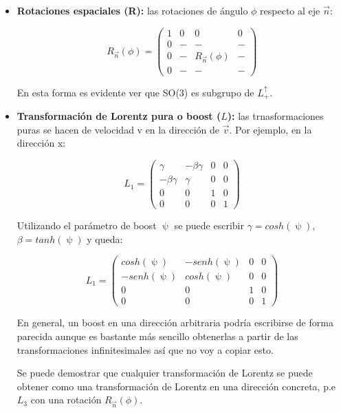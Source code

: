 \documentclass{article}
\begin{document}
\begin{itemize}
\item \textbf{Rotaciones espaciales (R):} las rotaciones de ángulo $\phi$ respecto al eje $\Vec{n}$:

$$R_{\Vec{n}}(\phi) = \left( \begin{array}{c|ccc}
     1& 0 & 0 & 0  \\
     \hline
       0& - & - & -  \\
         0& - & R_\Vec{n}(\phi) & -  \\
           0& - & - & -
\end{array}\right)$$

En esta forma es evidente ver que SO(3) es subgrupo de $L_+^\uparrow$.

\newpage

\item \textbf{Transformación de Lorentz pura o boost  ($L$):} las trnasformaciones puras se hacen de velocidad v en la dirección de $\Vec{v}$. Por ejemplo, en la dirección x:

$$L_1=\left ( \begin{array}{cccc}
       \gamma & -\beta \gamma & 0 & 0  \\
        -\beta \gamma & \gamma & 0 & 0  \\
          0& 0 & 1 & 0  \\
            0& 0 & 0 & 1
\end{array}\right)$$

Utilizando el parámetro de boost $\uppsi$ se puede escribir $\gamma =cosh(\uppsi)$, $\beta = tanh(\uppsi)$ y queda:

$$L_1=\left ( \begin{array}{cccc}
       cosh(\uppsi) & -senh(\uppsi) & 0 & 0  \\
        -senh(\uppsi) & cosh(\uppsi) & 0 & 0  \\
          0& 0 & 1 & 0  \\
            0& 0 & 0 & 1
\end{array}\right)$$

En general, un boost en una dirección arbitraria podría escribirse de forma parecida aunque es bastante más sencillo obtenerlas a partir de las transformaciones infinitesimales así que no voy a copiar esto.

\smallskip
Se puede demostrar que cualquier transformación de Lorentz se puede obtener como una transformación de Lorentz en una dirección concreta, p.e $L_3$ con una rotación $R_{\Vec{n}}(\phi)$.


\end{itemize}
\end{document}
